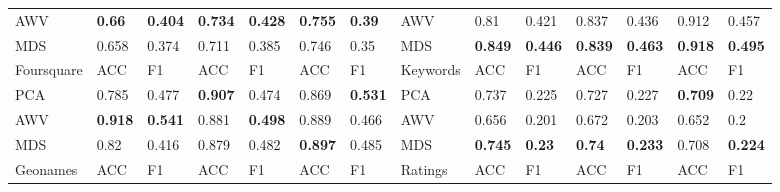 \begin{landscape}
\begin{table}[]
\begin{tabular}{llllllllllllll}
AWV        & \textbf{0.66}  & \textbf{0.404} & \textbf{0.734} & \textbf{0.428} & \textbf{0.755} & \textbf{0.39}  & AWV                             & 0.81                            & 0.421                           & 0.837                           & 0.436                           & 0.912                           & 0.457                           \\
MDS        & 0.658                           & 0.374                           & 0.711                           & 0.385                           & 0.746                           & 0.35                            & MDS                             & \textbf{0.849} & \textbf{0.446} & \textbf{0.839} & \textbf{0.463} & \textbf{0.918} & \textbf{0.495} \\
Foursquare & ACC                             & F1                              & ACC                             & F1                              & ACC                             & F1                              & Keywords                        & ACC                             & F1                              & ACC                             & F1                              & ACC                             & F1                              \\
PCA        & 0.785                           & 0.477                           & \textbf{0.907} & 0.474                           & 0.869                           & \textbf{0.531} & PCA                             & 0.737                           & 0.225                           & 0.727                           & 0.227                           & \textbf{0.709} & 0.22                            \\
AWV        & \textbf{0.918} & \textbf{0.541} & 0.881                           & \textbf{0.498} & 0.889                           & 0.466                           & AWV                             & 0.656                           & 0.201                           & 0.672                           & 0.203                           & 0.652                           & 0.2                             \\
MDS        & 0.82                            & 0.416                           & 0.879                           & 0.482                           & \textbf{0.897} & 0.485                           & MDS                             & \textbf{0.745} & \textbf{0.23}  & \textbf{0.74}  & \textbf{0.233} & 0.708                           & \textbf{0.224} \\
Geonames   & ACC                             & F1                              & ACC                             & F1                              & ACC                             & F1                              & Ratings                         & ACC                             & F1                              & ACC                             & F1                              & ACC                             & F1                              \\

\end{tabular}
\end{table}
\end{landscape}
